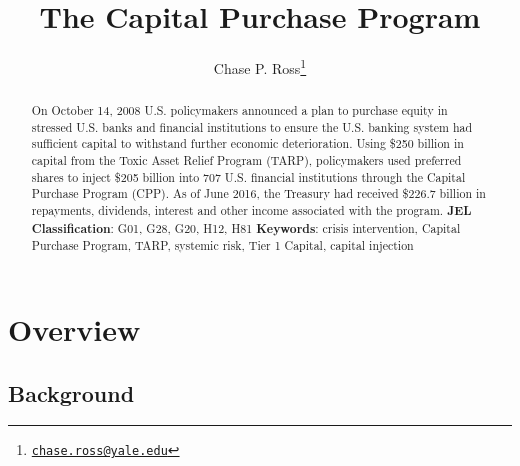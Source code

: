 \documentclass[12pt]{article}
\begin{document}
	\lhead{}
	\rhead{}
	\renewcommand{\headrulewidth}{0.0pt}
	\renewcommand{\footrulewidth}{0.0pt}

\title{The Capital Purchase Program}
\author{Chase P. Ross\thanks{\texttt{\href{mailto:chase.ross@yale.edu}{chase.ross@yale.edu}}}}

\maketitle


\begin{abstract}
On October 14, 2008 U.S. policymakers announced a plan to purchase equity in stressed U.S. banks and financial institutions to ensure the U.S. banking system had sufficient capital to withstand further economic deterioration. Using \$250 billion in capital from the Toxic Asset Relief Program (TARP), policymakers used preferred shares to inject \$205 billion into 707 U.S. financial institutions through the Capital Purchase Program (CPP). As of June 2016, the Treasury had received \$226.7 billion in repayments, dividends, interest and other income associated with the program.
\newline
\newline
\textbf{JEL Classification}: G01, G28, G20, H12, H81
\newline
\newline
\textbf{Keywords}: crisis intervention, Capital Purchase Program, TARP, systemic risk, Tier 1 Capital, capital injection

\end{abstract}
\newpage
\tableofcontents
\newpage
\linenumbers
\section{Overview}

\subsection{Background}
\end{document}
